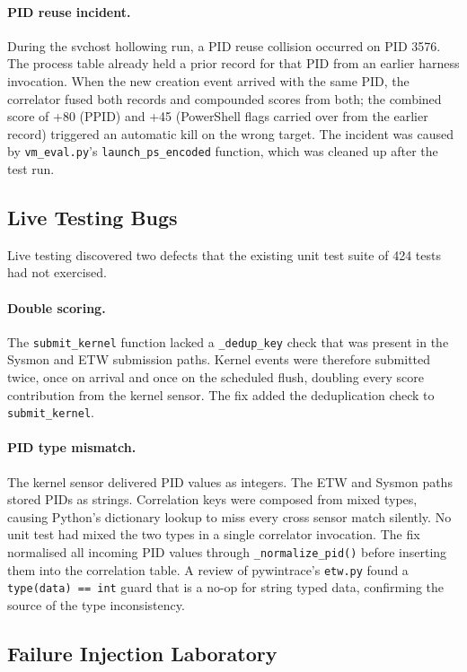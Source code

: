 \documentclass[10pt,twocolumn,letterpaper]{article}
\newcommand{\code}[1]{\texttt{\small #1}}
\begin{document}
\paragraph{PID reuse incident.}
During the svchost hollowing run, a PID reuse collision occurred on PID 3576. The process
table already held a prior record for that PID from an earlier harness invocation. When
the new creation event arrived with the same PID, the correlator fused both records and
compounded scores from both; the combined score of +80 (PPID) and +45 (PowerShell flags
carried over from the earlier record) triggered an automatic kill on the wrong target.
The incident was caused by \code{vm\_eval.py}'s \code{launch\_ps\_encoded} function,
which was cleaned up after the test run.

\subsection{Live Testing Bugs}
\label{sec:livebugs}

Live testing discovered two defects that the existing unit test suite of 424 tests had
not exercised.

\paragraph{Double scoring.}
The \code{submit\_kernel} function lacked a \code{\_dedup\_key} check that was present in
the Sysmon and ETW submission paths. Kernel events were therefore submitted twice, once on
arrival and once on the scheduled flush, doubling every score contribution from the
kernel sensor. The fix added the deduplication check to \code{submit\_kernel}.

\paragraph{PID type mismatch.}
The kernel sensor delivered PID values as integers. The ETW and Sysmon paths stored PIDs
as strings. Correlation keys were composed from mixed types, causing Python's dictionary
lookup to miss every cross sensor match silently. No unit test had mixed the two types in
a single correlator invocation. The fix normalised all incoming PID values through
\code{\_normalize\_pid()} before inserting them into the correlation table. A review of
pywintrace's \code{etw.py} found a \code{type(data) == int} guard that is a no-op for
string typed data, confirming the source of the type inconsistency.

\subsection{Failure Injection Laboratory}
\label{sec:faillab}
\end{document}

